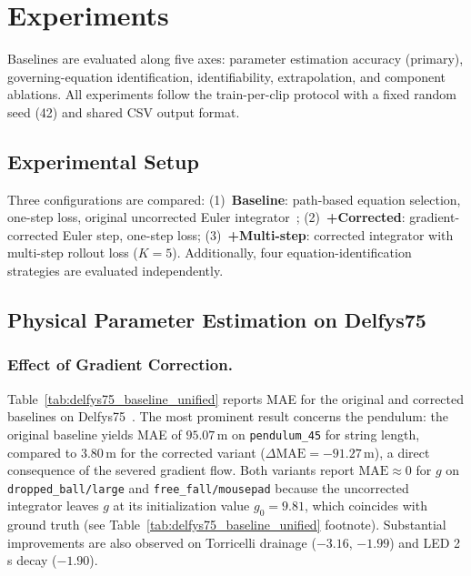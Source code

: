 \documentclass[runningheads]{llncs}
\begin{document}
\section{Experiments}
\label{sec:experiments}

Baselines are evaluated along five axes: parameter estimation accuracy (primary), governing-equation identification, identifiability, extrapolation, and component ablations. All experiments follow the train-per-clip protocol with a fixed random seed (42) and shared CSV output format.

\subsection{Experimental Setup}
\label{sec:exp_setup}

Three configurations are compared: (1)~\textbf{Baseline}: path-based equation selection, one-step loss, original uncorrected Euler integrator~\cite{garcia2025learning}; (2)~\textbf{+Corrected}: gradient-corrected Euler step, one-step loss; (3)~\textbf{+Multi-step}: corrected integrator with multi-step rollout loss ($K{=}5$). Additionally, four equation-identification strategies are evaluated independently.

\subsection{Physical Parameter Estimation on Delfys75}
\label{sec:exp_delfys}

\subsubsection{Effect of Gradient Correction.}

Table~\ref{tab:delfys75_baseline_unified} reports MAE for the original and corrected baselines on Delfys75~\cite{garcia2025learning}. The most prominent result concerns the pendulum: the original baseline yields MAE of $95.07$\,m on \texttt{pendulum\_45} for string length, compared to $3.80$\,m for the corrected variant ($\Delta\mathrm{MAE} = -91.27$\,m), a direct consequence of the severed gradient flow. Both variants report $\mathrm{MAE} \approx 0$ for $g$ on \texttt{dropped\_ball/large} and \texttt{free\_fall/mousepad} because the uncorrected integrator leaves $g$ at its initialization value $g_0 = 9.81$, which coincides with ground truth (see Table~\ref{tab:delfys75_baseline_unified} footnote). Substantial improvements are also observed on Torricelli drainage ($-3.16$, $-1.99$) and LED 2\,s decay ($-1.90$).
\end{document}
